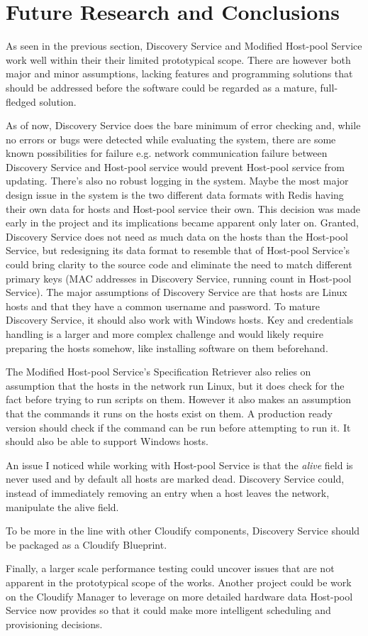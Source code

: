\newpage

\section{Future Research and Conclusions} \label{future}

As seen in the previous section, Discovery Service and Modified Host-pool Service work well within their their limited prototypical scope. There are however both major and minor assumptions, lacking features and programming solutions that should be addressed before the software could be regarded as a mature, full-fledged solution.

As of now, Discovery Service does the bare minimum of error checking and, while no errors or bugs were detected while evaluating the system, there are some known possibilities for failure e.g. network communication failure between Discovery Service and Host-pool service would prevent Host-pool service from updating. There's also no robust logging in the system.
Maybe the most major design issue in the system is the two different data formats with Redis having their own data for hosts and Host-pool service their own. This decision was made early in the project and its implications became apparent only later on. Granted, Discovery Service does not need as much data on the hosts than the Host-pool Service, but redesigning its data format to resemble that of Host-pool Service's could bring clarity to the source code and eliminate the need to match different primary keys (MAC addresses in Discovery Service, running count in Host-pool Service).
The major assumptions of Discovery Service are that hosts are Linux hosts and that they have a common username and password. To mature Discovery Service, it should also work with Windows hosts. Key and credentials handling is a larger and more complex challenge and would likely require preparing the hosts somehow, like installing software on them beforehand.

The Modified Host-pool Service's Specification Retriever also relies on assumption that the hosts in the network run Linux, but it does check for the fact before trying to run scripts on them. However it also makes an assumption that the commands it runs on the hosts exist on them. A production ready version should check if the command can be run before attempting to run it. It should also be able to support Windows hosts.

An issue I noticed while working with Host-pool Service is that the \textit{alive} field is never used and by default all hosts are marked dead. Discovery Service could, instead of immediately removing an entry when a host leaves the network, manipulate the alive field.

To be more in the line with other Cloudify components, Discovery Service should be packaged as a Cloudify Blueprint. 

Finally, a larger scale performance testing could uncover issues that are not apparent in the prototypical scope of the works. Another project could be work on the Cloudify Manager to leverage on more detailed hardware data Host-pool Service now provides so that it could make more intelligent scheduling and provisioning decisions.

\clearpage
\newpage